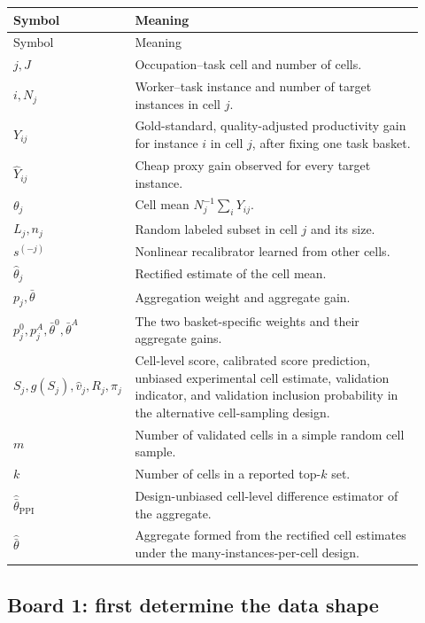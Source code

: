 \documentclass[11pt]{article}
\begin{document}
  \begin{longtable}{>{\raggedright\arraybackslash}p{0.22\linewidth}
                    >{\raggedright\arraybackslash}p{0.70\linewidth}}
  \toprule
  Symbol & Meaning \\
  \midrule
  \endfirsthead
  \toprule
  Symbol & Meaning \\
  \midrule
  \endhead
  \(j,J\) & Occupation--task cell and number of cells. \\
  \(i,N_j\) & Worker--task instance and number of target instances in cell \(j\). \\
  \(Y_{ij}\) & Gold-standard, quality-adjusted productivity gain for instance
  \(i\) in cell \(j\), after fixing one task basket. \\
  \(\widehat Y_{ij}\) & Cheap proxy gain observed for every target instance. \\
  \(\theta_j\) & Cell mean \(N_j^{-1}\sum_iY_{ij}\). \\
  \(L_j,n_j\) & Random labeled subset in cell \(j\) and its size. \\
  \(s^{(-j)}\) & Nonlinear recalibrator learned from other cells. \\
  \(\widehat\theta_j\) & Rectified estimate of the cell mean. \\
  \(p_j,\bar\theta\) & Aggregation weight and aggregate gain. \\
  \(p_j^0,p_j^A,\bar\theta^0,\bar\theta^A\) & The two basket-specific weights
  and their aggregate gains. \\
  \(S_j,g(S_j),\widehat v_j,R_j,\pi_j\) & Cell-level score, calibrated score
  prediction, unbiased experimental
  cell estimate, validation indicator, and validation inclusion probability in
  the alternative cell-sampling design. \\
  \(m\) & Number of validated cells in a simple random cell sample. \\
  \(k\) & Number of cells in a reported top-\(k\) set. \\
  \(\widehat{\bar\theta}_{\mathrm{PPI}}\) & Design-unbiased cell-level
  difference estimator of the aggregate. \\
  \(\widehat{\bar\theta}\) & Aggregate formed from the rectified cell estimates
  under the many-instances-per-cell design. \\
  \bottomrule
  \end{longtable}
  
  \subsection*{Board 1: first determine the data shape}
  
\end{document}
